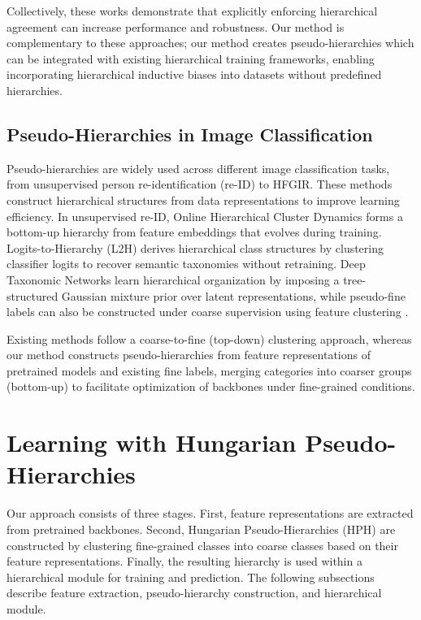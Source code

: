 \documentclass[10pt,twocolumn,letterpaper]{article}
\begin{document}
Collectively, these works demonstrate that explicitly enforcing hierarchical agreement can increase performance and robustness. Our method is complementary to these approaches; our method creates pseudo-hierarchies which can be integrated with existing hierarchical training frameworks, enabling incorporating hierarchical inductive biases into datasets without predefined hierarchies.

\subsection{Pseudo-Hierarchies in Image Classification}
Pseudo-hierarchies are widely used across different image classification tasks, from unsupervised person re-identification (re-ID) to HFGIR. These methods construct hierarchical structures from data representations to improve learning efficiency. In unsupervised re-ID, Online Hierarchical Cluster Dynamics \cite{zheng_online_2021} forms a bottom-up hierarchy from feature embeddings that evolves during training. Logits-to-Hierarchy (L2H) \cite{palumbo_logits_2025} derives hierarchical class structures by clustering classifier logits to recover semantic taxonomies without retraining. Deep Taxonomic Networks \cite{wang_deep_2025} learn hierarchical organization by imposing a tree-structured Gaussian mixture prior over latent representations, while pseudo-fine labels can also be constructed under coarse supervision using feature clustering \cite{hsieh_pseudo-label_2019}.

Existing methods follow a coarse-to-fine (top-down) clustering approach, whereas our method constructs pseudo-hierarchies from feature representations of pretrained models and existing fine labels, merging categories into coarser groups (bottom-up) to facilitate optimization of backbones under fine-grained conditions.



\section{Learning with Hungarian Pseudo-Hierarchies}
\label{sec_method}
Our approach consists of three stages. First, feature representations are extracted from pretrained backbones. Second, Hungarian Pseudo-Hierarchies (HPH) are constructed by clustering fine-grained classes into coarse classes based on their feature representations. Finally, the resulting hierarchy is used within a hierarchical module for training and prediction. The following subsections describe feature extraction, pseudo-hierarchy construction, and hierarchical module.
\end{document}
